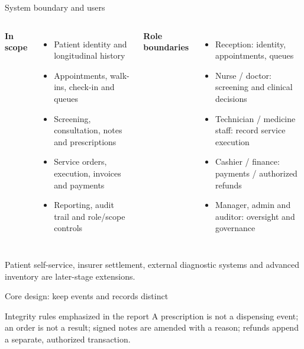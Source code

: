 ﻿\documentclass[aspectratio=169,10pt]{beamer}
\begin{document}
\begin{frame}{System boundary and users}
  \begin{columns}[T,onlytextwidth]
      \textbf{In scope}
      \begin{itemize}\item Patient identity and longitudinal history
        \item Appointments, walk-ins, check-in and queues
        \item Screening, consultation, notes and prescriptions
        \item Service orders, execution, invoices and payments
        \item Reporting, audit trail and role/scope controls
      \end{itemize}
      \textbf{Role boundaries}
      \begin{itemize}\item Reception: identity, appointments, queues
        \item Nurse / doctor: screening and clinical decisions
        \item Technician / medicine staff: record service execution
        \item Cashier / finance: payments / authorized refunds
        \item Manager, admin and auditor: oversight and governance
      \end{itemize}
  \end{columns}
  \vspace{.3em}\footnotesize Patient self-service, insurer settlement, external diagnostic systems and advanced inventory are later-stage extensions.
\end{frame}

\begin{frame}{Core design: keep events and records distinct}
  \centering
  \vspace{1em}
  \begin{block}{Integrity rules emphasized in the report}
    A prescription is not a dispensing event; an order is not a result; signed notes are amended with a reason; refunds append a separate, authorized transaction.
  \end{block}
\end{frame}
\end{document}
